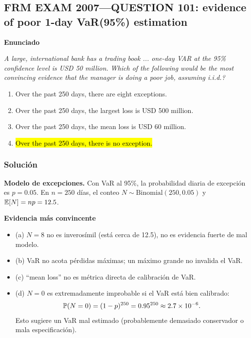 ﻿\subsection{FRM EXAM 2007---QUESTION 101: evidence of poor 1-day VaR(95\%) estimation}

\textbf{Enunciado}

\emph{A large, international bank has a trading book ... one-day VAR at the 95\% confidence level is USD 50 million.
Which of the following would be the most convincing evidence that the manager is doing a poor job, assuming i.i.d.?}
\begin{enumerate}[label=\alph*.]
\item Over the past 250 days, there are eight exceptions.
\item Over the past 250 days, the largest loss is USD 500 million.
\item Over the past 250 days, the mean loss is USD 60 million.
\item \hl{Over the past 250 days, there is no exception.}
\end{enumerate}

\subsubsection*{Solución}


\textbf{Modelo de excepciones. }Con VaR al 95\%, la probabilidad diaria de excepción es \(p=0.05\).
En \(n=250\) días, el conteo \(N\sim\mathrm{Binomial}(250,0.05)\) y \(\mathbb{E}[N]=np=12.5\).

\textbf{Evidencia más convincente}\\
\begin{itemize}
\item (a) \(N=8\) no es inverosímil (está cerca de 12.5), no es evidencia fuerte de mal modelo.
\item (b) VaR no acota pérdidas máximas; un máximo grande no invalida el VaR.
\item (c) ``mean loss'' no es métrica directa de calibración de VaR.
\item (d) \(N=0\) es extremadamente improbable si el VaR está bien calibrado:
\[
\mathbb{P}(N=0)=(1-p)^{250}=0.95^{250}\approx 2.7\times 10^{-6}.
\]
Esto sugiere un VaR mal estimado (probablemente demasiado conservador o mala especificación).
\end{itemize}













